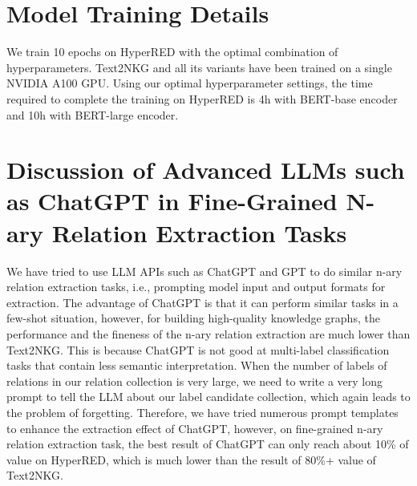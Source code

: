 \documentclass{article} \usepackage{iclr2024_conference,times}
\begin{document}
\begin{table}[h]
\centering
{}

\caption{\label{t6}
Hyperparameter Selection.
}

\end{table}



\section{Model Training Details}
\label{train}
We train 10 epochs on HyperRED with the optimal combination of hyperparameters. Text2NKG and all its variants have been trained on a single NVIDIA A100 GPU. Using our optimal hyperparameter settings, the time required to complete the training on HyperRED is 4h with BERT-base encoder and 10h with BERT-large encoder.


\section{Discussion of Advanced LLMs such as ChatGPT in Fine-Grained N-ary Relation Extraction Tasks}
\label{chatgpt}




We have tried to use LLM APIs such as ChatGPT and GPT to do similar n-ary relation extraction tasks, i.e., prompting model input and output formats for extraction. The advantage of ChatGPT is that it can perform similar tasks in a few-shot situation, however, for building high-quality knowledge graphs, the performance and the fineness of the n-ary relation extraction are much lower than Text2NKG. This is because ChatGPT is not good at multi-label classification tasks that contain less semantic interpretation. When the number of labels of relations in our relation collection is very large, we need to write a very long prompt to tell the LLM about our label candidate collection, which again leads to the problem of forgetting. Therefore, we have tried numerous prompt templates to enhance the extraction effect of ChatGPT, however, on fine-grained n-ary relation extraction task, the best result of ChatGPT can only reach about 10\% of  value on HyperRED, which is much lower than the result of 80\%+  value of Text2NKG. 
\end{document}
